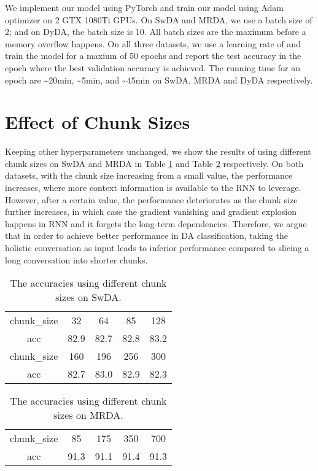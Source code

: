 \documentclass[11pt]{article}
\begin{document}
We implement our model using PyTorch and train our model using Adam optimizer on 2 GTX 1080Ti GPUs. On SwDA and MRDA, we use a batch size of 2; and on DyDA, the batch size is 10. All batch sizes are the maximum before a memory overflow happens.
On all three datasets, we use a learning rate of  and train the model for a maxium of 50 epochs and report the test accuracy in the epoch where the best validation accuracy is achieved. The running time for an epoch are \textasciitilde20min, \textasciitilde5min, and \textasciitilde45min on SwDA, MRDA and DyDA respectively.



\section{Effect of Chunk Sizes}
Keeping other hyperparameters unchanged, we show the results of using different chunk sizes on SwDA and MRDA in Table \ref{tab:chunk-swda} and Table \ref{tab:chunk-mrda} respectively. On both datasets, with the chunk size increasing from a small value, the performance increases, where more context information is available to the RNN to leverage. However, after a certain value, the performance deteriorates as the chunk size further increases, in which case the gradient vanishing and gradient explosion happens in RNN and it forgets the long-term dependencies. Therefore, we argue that in order to achieve better performance in DA classification, taking the holistic conversation as input leads to inferior performance compared to slicing a long conversation into shorter chunks.


\begin{table}[ht]
\centering
\begin{tabular}{ccccc}
\hline
chunk\_size & 32   & 64   & 85   & 128  \\
acc        & 82.9 & 82.7 & 82.8 & 83.2 \\ \hline
chunk\_size & 160  & 196  & 256  & 300  \\
acc        & 82.7 & 83.0 & 82.9 & 82.3 \\ \hline
\end{tabular}
\caption{The accuracies using different chunk sizes on SwDA.}
\label{tab:chunk-swda}
\end{table}

\begin{table}[ht]
\centering
\begin{tabular}{ccccc}
\hline
chunk\_size & 85   & 175  & 350  & 700  \\
acc         & 91.3 & 91.1 & 91.4 & 91.3 \\ \hline
\end{tabular}
\caption{The accuracies using different chunk sizes on MRDA.}
\label{tab:chunk-mrda}
\end{table}
\end{document}
